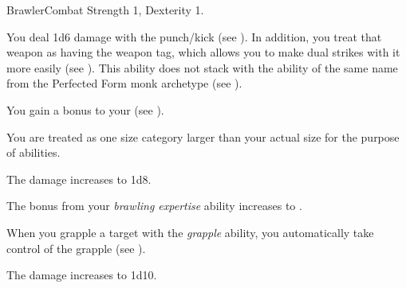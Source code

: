   \begin{feat}{Brawler}{Combat}
    \featpre Strength 1, Dexterity 1.

     You deal 1d6 damage with the punch/kick  (see ).
    In addition, you treat that weapon as having the  weapon tag, which allows you to make dual strikes with it more easily (see ).
    This ability does not stack with the ability of the same name from the Perfected Form monk archetype (see ).

     You gain a  bonus to your  (see ).

     You are treated as one size category larger than your actual size for the purpose of \atSizeBased \atBrawling abilities.

     The damage increases to 1d8.

     The bonus from your \textit{brawling expertise} ability increases to .

     When you grapple a target with the \textit{grapple} ability, you automatically take control of the grapple (see ).

     The damage increases to 1d10.
  \end{feat}

